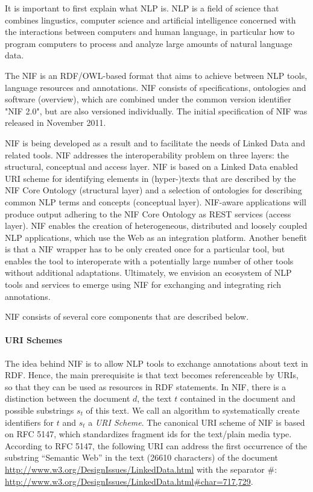 \documentclass[thesis=M,english,hidelinks]{FITthesis}[2019/12/23]
\begin{document}
It is important to first explain what \gls{NLP} is. \gls{NLP} is a field of science that combines lingustics, computer science and artificial intelligence concerned with the interactions between computers and human language, in particular how to program computers to process and analyze large amounts of natural language data.

The \gls{NIF} is an \gls{RDF}/\gls{OWL}-based format that aims to achieve between \gls{NLP} tools, language resources and annotations. NIF consists of specifications, ontologies and software (overview), which are combined under the common version identifier "NIF 2.0", but are also versioned individually\cite{nlp_cite}. The initial specification of \gls{NIF} was released in November 2011.

\gls{NIF} is being developed as a result and to facilitate the needs of Linked Data and related tools.  NIF addresses the interoperability problem on three layers: the structural, conceptual and access layer. NIF is based on a Linked Data enabled URI scheme for identifying elements in (hyper-)texts that are described by the NIF Core Ontology (structural layer) and a selection of ontologies for describing common NLP terms and concepts (conceptual layer). NIF-aware applications will produce output adhering to the NIF Core Ontology as REST services (access layer). NIF enables the creation of heterogeneous, distributed and loosely coupled NLP applications, which use the Web as an integration platform. Another benefit is
that a NIF wrapper has to be only created once for a particular tool, but enables the tool to interoperate with a potentially large number of other tools without additional adaptations. Ultimately, we envision an ecosystem of NLP tools and services to emerge using NIF for exchanging and integrating rich annotations.

\gls{NIF} consists of several core components that are described below.

\paragraph{URI Schemes}

The idea behind NIF is to allow NLP tools to exchange annotations about text in RDF. Hence, the main prerequisite is that text becomes referenceable by URIs, so that they can be used as resources in RDF statements\cite{linked_data_uri}\cite{workflow_modularity}. In NIF, there is a distinction between the document $d$, the text $t$ contained in the document and possible substrings $s_{t}$ of this text.  We call an algorithm to systematically create identifiers for $t$ and $s_{t}$ a \textit{URI Scheme}.  The canonical URI scheme of NIF is based on RFC 5147\cite{nif_rdf}, which standardizes fragment ids for the text/plain media type. According to RFC 5147, the following URI can address the first occurrence of the substring “Semantic Web” in the
text (26610 characters) of the document \url{http://www.w3.org/DesignIssues/LinkedData.html} with the separator \#: \url{http://www.w3.org/DesignIssues/LinkedData.html\#char=717,729}.
\end{document}
